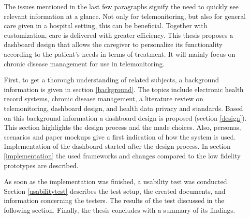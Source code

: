 The issues mentioned in the last few paragraphs signify the need to quickly see relevant information at a glance. Not only for telemonitoring, but also for general care given in a hospital setting, this can be beneficial. Together with customization, care is delivered with greater efficiency. This thesis proposes a dashboard design that allows the caregiver to personalize its functionality according to the patient's needs in terms of treatment. It will mainly focus on chronic disease management for use in telemonitoring.

First, to get a thorough understanding of related subjects, a background information is given in section \ref{background}. The topics include electronic health record systems, chronic disease management, a literature review on telemonitoring, dashboard design, and health data privacy and standards. Based on this background information a dashboard design is proposed (section \ref{design}). This section highlights the design process and the made choices. Also, personas, scenarios and paper mockups give a first indication of how the system is used. Implementation of the dashboard started after the design process. In section \ref{implementation} the used frameworks and changes compared to the low fidelity prototypes are described.

As soon as the implementation was finished, a usability test was conducted. Section \ref{usabilitytest} describes the test setup, the created documents, and information concerning the testers. The results of the test discussed in the following section. Finally, the thesis concludes with a summary of its findings. 